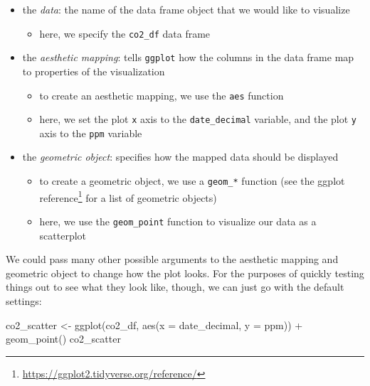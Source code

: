\documentclass[
]{krantz}
\makeatletter
\newenvironment{Shaded}{\begin{snugshade}}{\end{snugshade}}
\newcommand{\AttributeTok}[1]{\textcolor[rgb]{0.61,0.61,0.61}{#1}}
\newcommand{\FunctionTok}[1]{\textcolor[rgb]{0,0,0}{#1}}
\newcommand{\NormalTok}[1]{#1}
\newcommand{\OtherTok}[1]{\textcolor[rgb]{0.37,0.37,0.37}{#1}}
\newcommand{\SpecialCharTok}[1]{\textcolor[rgb]{0,0,0}{#1}}
\providecommand{\tightlist}{%
  \setlength{\itemsep}{0pt}\setlength{\parskip}{0pt}}
\renewcommand{\href}[2]{#2\footnote{\url{#1}}}
\newenvironment{kframe}{%
\medskip{}
\setlength{\fboxsep}{.8em}
 \def\at@end@of@kframe{}%
 \ifinner\ifhmode%
  \def\at@end@of@kframe{\end{minipage}}%
  \begin{minipage}{\columnwidth}%
 \fi\fi%
 \def\FrameCommand##1{\hskip\@totalleftmargin \hskip-\fboxsep
 \colorbox{shadecolor}{##1}\hskip-\fboxsep
     \hskip-\linewidth \hskip-\@totalleftmargin \hskip\columnwidth}%
 \MakeFramed {\advance\hsize-\width
   \@totalleftmargin\z@ \linewidth\hsize
   \@setminipage}}%
 {\par\unskip\endMakeFramed%
 \at@end@of@kframe}
\renewenvironment{Shaded}{\begin{kframe}}{\end{kframe}}
\makeatother
\begin{document}
\begin{itemize}
\tightlist
\item
  the \emph{data}: the name of the data frame object that we would like to visualize

  \begin{itemize}
  \tightlist
  \item
    here, we specify the \texttt{co2\_df} data frame
  \end{itemize}
\item
  the \emph{aesthetic mapping}: tells \texttt{ggplot} how the columns in the data frame map to properties of the visualization

  \begin{itemize}
  \tightlist
  \item
    to create an aesthetic mapping, we use the \texttt{aes} function
  \item
    here, we set the plot \texttt{x} axis to the \texttt{date\_decimal} variable, and the plot \texttt{y} axis to the \texttt{ppm} variable
  \end{itemize}
\item
  the \emph{geometric object}: specifies how the mapped data should be displayed

  \begin{itemize}
  \tightlist
  \item
    to create a geometric object, we use a \texttt{geom\_*} function (see the \href{https://ggplot2.tidyverse.org/reference/}{ggplot reference} for a list of geometric objects)
  \item
    here, we use the \texttt{geom\_point} function to visualize our data as a scatterplot
  \end{itemize}
\end{itemize}

We could pass many other possible arguments to the aesthetic mapping and geometric object to change how the plot looks. For
the purposes of quickly testing things out to see what they look like, though, we can just go with the default settings:

\begin{Shaded}
\begin{Highlighting}[]
\NormalTok{co2\_scatter }\OtherTok{\textless{}{-}} \FunctionTok{ggplot}\NormalTok{(co2\_df, }\FunctionTok{aes}\NormalTok{(}\AttributeTok{x =}\NormalTok{ date\_decimal, }\AttributeTok{y =}\NormalTok{ ppm)) }\SpecialCharTok{+}
  \FunctionTok{geom\_point}\NormalTok{()}
\NormalTok{co2\_scatter}
\end{Highlighting}
\end{Shaded}
\end{document}
